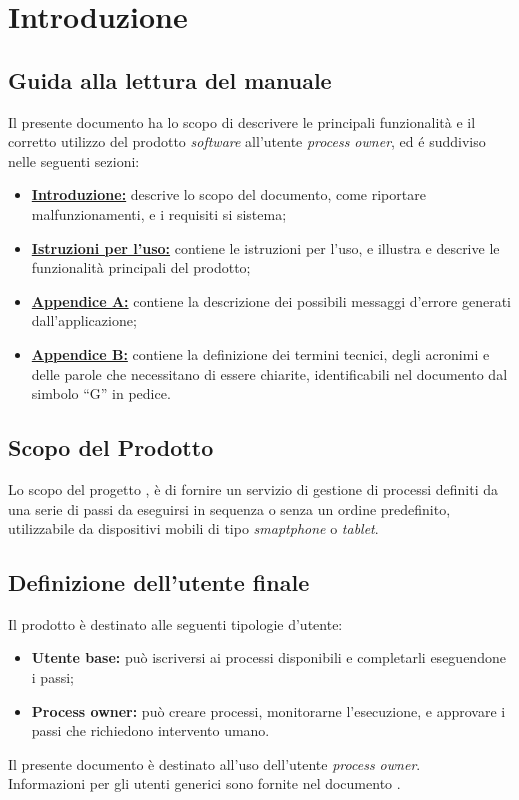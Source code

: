 \section{Introduzione}
\label{introduzione}
\subsection{Guida alla lettura del manuale}
Il presente documento ha lo scopo di descrivere le principali funzionalità e il corretto utilizzo del prodotto \textit{software} \progetto{} all'utente \textit{process owner}, ed é suddiviso nelle seguenti sezioni:

\begin{itemize}
\item \hyperref[introduzione]{\textbf{Introduzione:}} descrive lo scopo del documento, come riportare malfunzionamenti, e i requisiti si sistema;
\item \hyperref[istruzioni]{\textbf{Istruzioni per l'uso:}} contiene le istruzioni per l'uso, e illustra e descrive le funzionalità principali del prodotto;
\item \hyperref[errori]{\textbf{Appendice A:}} contiene la descrizione dei possibili messaggi d'errore generati dall'applicazione;
\item \hyperref[glossario]{\textbf{Appendice B:}} contiene la definizione dei termini tecnici, degli acronimi e delle parole che necessitano di essere chiarite, identificabili nel documento dal simbolo ``G'' in pedice.
\end{itemize}


\subsection{Scopo del Prodotto}
Lo scopo del progetto \progetto{}, è di fornire un servizio di gestione di processi definiti da una serie di passi da eseguirsi in sequenza o senza un ordine predefinito, utilizzabile da dispositivi mobili di tipo \textit{smaptphone} o \textit{tablet}.

\subsection{Definizione dell'utente finale}
Il prodotto è destinato alle seguenti tipologie d'utente:
\begin{itemize}
\item \textbf{Utente base:} può iscriversi ai processi disponibili e completarli eseguendone i passi;
\item \textbf{Process owner:} può creare processi, monitorarne l'esecuzione, e approvare i passi che richiedono intervento umano.
\end{itemize}
Il presente documento è destinato all'uso dell'utente \textit{process owner}.\\
Informazioni per gli utenti generici sono fornite nel documento \ManualeUtente{}.


